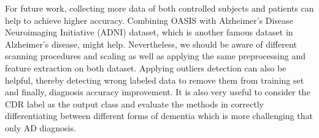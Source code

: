 For future work, collecting more data of both controlled subjects and patients can help to achieve higher accuracy. Combining OASIS with Alzheimer’s Disease Neuroimaging Initiative (ADNI) dataset, which is another famous dataset in Alzheimer's disease, might help. Nevertheless, we should be aware of different scanning procedures and scaling as well as applying the same preprocessing and feature extraction on both dataset. Applying outliers detection can also be helpful, thereby detecting wrong labeled data to remove them from training set and finally, diagnosis accuracy improvement. It is also very useful to consider the CDR label as the output class and evaluate the methods in correctly differentiating between different forms of dementia which is more challenging that only AD diagnosis. 



